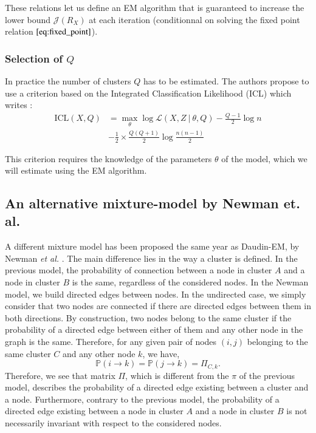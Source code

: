 \documentclass[switch, 12pt]{article}
\begin{document}
\begin{multicols}{2}
    These relations let us define an EM algorithm that is guaranteed to increase the lower bound $\mathcal{J}(R_X)$ at each iteration (conditionnal on solving the fixed point relation $\eqref{eq:fixed_point}$).

    \subsubsection{Selection of $Q$}
    \label{subsubsec:icl}

    In practice the number of clusters $Q$ has to be estimated. The authors propose to use a criterion based on the Integrated Classification Likelihood (ICL) which writes :
    \begin{equation}
        \begin{aligned}
            \mathrm{ICL}(X, Q) & =\max_\theta\log \mathcal{L}(X, Z \ |\ \theta, Q)-\frac{Q-1}{2}\log n \\&-\frac{1}{2}\times\frac{Q(Q+1)}{2}\log\frac{n(n-1)}{2}
        \end{aligned}
    \end{equation}

    This criterion requires the knowledge of the parameters $\theta$ of the model, which we will estimate using the EM algorithm.

    \subsection{An alternative mixture-model by Newman et. al.}
    \label{subsec:newman}

    A different mixture model has been proposed the same year as Daudin-EM, by Newman \textit{et al.} \cite{newman}. The main difference lies in the way a cluster is defined. In the previous model, the probability of connection between a node in cluster $A$ and a node in cluster $B$ is the same, regardless of the considered nodes.
    \newline
    \newline
    In the Newman model, we build directed edges between nodes. In the undirected case, we simply consider that two nodes are connected if there are directed edges between them in both directions. By construction, two nodes belong to the same cluster if the probability of a directed edge between either of them and any other node in the graph is the same. Therefore, for any given pair of nodes $(i, j)$ belonging to the same cluster $C$ and any other node $k$, we have,
    \begin{equation}
        \mathbb{P}(i \rightarrow k) = \mathbb{P}(j \rightarrow k) = \Pi_{C, k}.
    \end{equation}
    Therefore, we see that matrix $\Pi$, which is different from the $\pi$ of the previous model, describes the probability of a directed edge existing between a cluster and a node. Furthermore, contrary to the previous model, the probability of a directed edge existing between a node in cluster $A$ and a node in cluster $B$ is not necessarily invariant with respect to the considered nodes.


\end{multicols}
\end{document}
